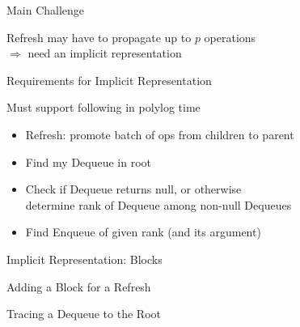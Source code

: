\documentclass[compress]{beamer}
\newcommand{\Red}[1]{{\color{red}#1}}
\newcommand{\op}[1]{\mbox{\sc #1}}
\begin{document}
\begin{frame}{Main Challenge}

Refresh may have to propagate up to $p$ operations\\
$\Rightarrow$ need an \Red{implicit representation}

\end{frame}

\begin{frame}{Requirements for Implicit Representation}

\hspace*{7mm}
\only<2>{}%
\only<3>{}%

Must support following in polylog time
\begin{itemize}
\pause
\item Refresh: promote batch of ops from children to parent
\pause
\item Find my \op{Dequeue} in root
\pause
\item Check if \op{Dequeue} returns null, or otherwise\\
determine rank of \op{Dequeue} among non-null \op{Dequeues}
\pause
\item Find \op{Enqueue} of given rank (and its argument)
\end{itemize}

\end{frame}

\begin{frame}{Implicit Representation:  Blocks}

\only<2->{}%

\vfill 

\only<4>{}%

\end{frame}

\begin{frame}{Adding a Block for a Refresh}

\vfill

\end{frame}

\begin{frame}{Tracing a \op{Dequeue} to the Root}

\vfill

\end{frame}
\end{document}
